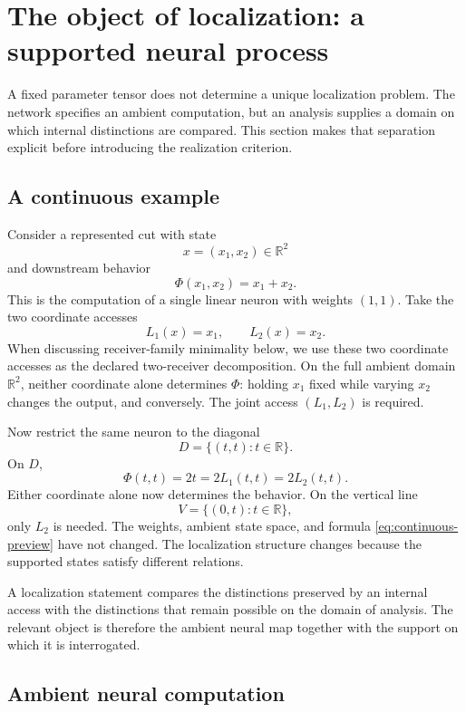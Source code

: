 \section{The object of localization: a supported neural process}
\label{sec:supported-process}

A fixed parameter tensor does not determine a unique localization problem. The network specifies an ambient computation, but an analysis supplies a domain on which internal distinctions are compared. This section makes that separation explicit before introducing the realization criterion.

\subsection{A continuous example}

Consider a represented cut with state
\[
x=(x_1,x_2)\in\mathbb R^2
\]
and downstream behavior
\begin{equation}
\Phi(x_1,x_2)=x_1+x_2.
\label{eq:continuous-preview}
\end{equation}
This is the computation of a single linear neuron with weights $(1,1)$. Take the two coordinate accesses
\[
L_1(x)=x_1,
\qquad
L_2(x)=x_2.
\]
When discussing receiver-family minimality below, we use these two coordinate accesses as the declared two-receiver decomposition. On the full ambient domain $\mathbb R^2$, neither coordinate alone determines $\Phi$: holding $x_1$ fixed while varying $x_2$ changes the output, and conversely. The joint access $(L_1,L_2)$ is required.

Now restrict the same neuron to the diagonal
\[
D=\{(t,t):t\in\mathbb R\}.
\]
On $D$,
\[
\Phi(t,t)=2t=2L_1(t,t)=2L_2(t,t).
\]
Either coordinate alone now determines the behavior. On the vertical line
\[
V=\{(0,t):t\in\mathbb R\},
\]
only $L_2$ is needed. The weights, ambient state space, and formula \eqref{eq:continuous-preview} have not changed. The localization structure changes because the supported states satisfy different relations.

A localization statement compares the distinctions preserved by an internal access with the distinctions that remain possible on the domain of analysis. The relevant object is therefore the ambient neural map together with the support on which it is interrogated.

\subsection{Ambient neural computation}

